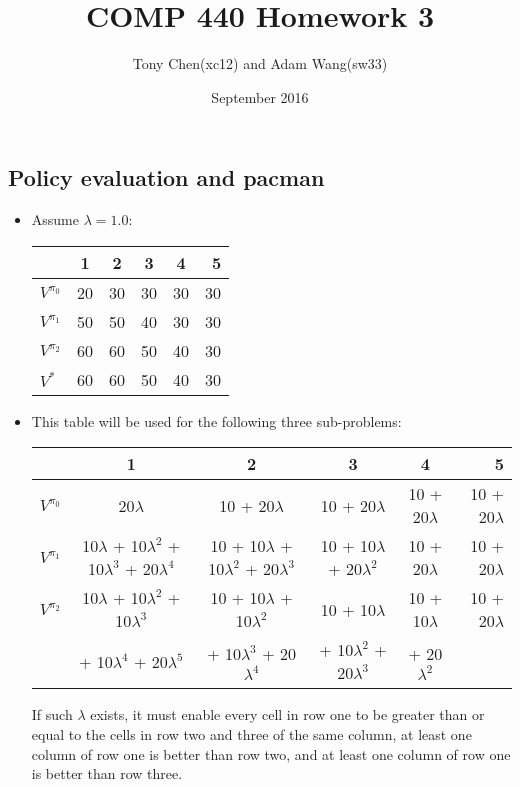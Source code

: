 \documentclass[11pt]{article}
\title{COMP 440 Homework 3}
\author{Tony Chen(xc12) and Adam Wang(sw33)}
\date{September 2016}
\begin{document}
\begin{onehalfspace}
\maketitle{}
\section{Policy evaluation and pacman}
 \begin{itemize}
    \item Assume $\lambda = 1.0$:\\
    \begin{center}
    	\begin{tabular}{| l | c | c | c | c | r |}
	\hline
	& 1 & 2 & 3 & 4 & 5 \\ \hline
	$V^{\pi_0}$ & 20 & 30 & 30 & 30 & 30 \\ \hline
	$V^{\pi_1}$ & 50 & 50 & 40 & 30 & 30 \\ \hline
	$V^{\pi_2}$ & 60 & 60 & 50 & 40 & 30 \\ \hline
	$V^{*}$ & 60 & 60 & 50 & 40 & 30 \\
	\hline
	\end{tabular}
    \end{center}
    \item This table will be used for the following three sub-problems:
    \begin{center}
    	\begin{tabular}{| l | c | c | c | c | r |}
	\hline
	& 1 & 2 & 3 & 4 & 5 \\ \hline
	$V^{\pi_0}$ & 20$\lambda$ & 10 + 20$\lambda$ & 10 + 20$\lambda$ & 10 + 20$\lambda$ & 10 + 20$\lambda$ \\ \hline
	$V^{\pi_1}$ & 10$\lambda$ + 10$\lambda^2$ + 10$\lambda^3$ + 20$\lambda^4$ & 10 + 10$\lambda$ + 10$\lambda^2$ + 20$\lambda^3$ & 10 + 10$\lambda$ + 20$\lambda^2$ & 10 + 20$\lambda$ & 10 + 20$\lambda$ \\ \hline
	$V^{\pi_2}$ & 10$\lambda$ + 10$\lambda^2$ + 10$\lambda^3$ & 10 + 10$\lambda$ + 10$\lambda^2$ & 10 + 10$\lambda$ & 10 + 10$\lambda$ & 10 + 20$\lambda$ \\
	& + 10$\lambda^4$ + 20$\lambda^5$ & + 10$\lambda^3$ + 20$\lambda^4$ & + 10$\lambda^2$ + 20$\lambda^3$ & + 20$\lambda^2$ & \\
	\hline
	\end{tabular}
    \end{center}
    If such $\lambda$ exists, it must enable every cell in row one to be greater than or equal to the cells in row two and three of the same column, at least one column of row one is better than row two, and at least one column of row one is better than row three.\\

\end{itemize}
\end{onehalfspace}
\end{document}
